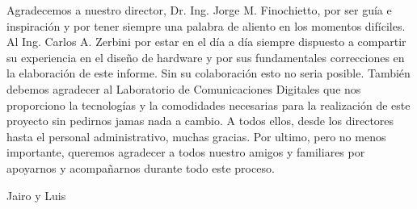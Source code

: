 \documentclass[11pt,A4paper,oneside]{book}
\newenvironment{dedication}
{
   \cleardoublepage
   \thispagestyle{empty}
   \vspace*{\stretch{1}}
   \hfill\begin{minipage}[t]{0.66\textwidth}
   \raggedright
}%
{
   \end{minipage}
   \vspace*{\stretch{3}}
   \clearpage
}
\begin{document}



\frontmatter
\begin{dedication}

Agradecemos a nuestro director,  Dr. Ing. Jorge M. Finochietto, por ser guía e inspiración y por tener siempre una palabra de aliento en los momentos difíciles.
Al Ing. Carlos A. Zerbini por estar en el día a día siempre dispuesto a compartir su experiencia en el diseño de hardware y por sus fundamentales correcciones en la elaboración de este informe. Sin su colaboración esto no seria posible.
También debemos agradecer al Laboratorio de Comunicaciones Digitales que nos proporciono la tecnologías y la comodidades necesarias para la realización  de este proyecto sin pedirnos jamas nada a cambio. A todos ellos, desde los directores hasta el personal administrativo, muchas gracias.
Por ultimo, pero no menos importante, queremos agradecer a todos nuestro amigos y familiares por apoyarnos y acompañarnos durante todo este proceso.


\begin{flushright}Jairo y Luis\end{flushright} 

\end{dedication}

\tableofcontents            %
\listoffigures              %
\listoftables               %

\mainmatter

 

 
 
 
\backmatter


\end{document}
